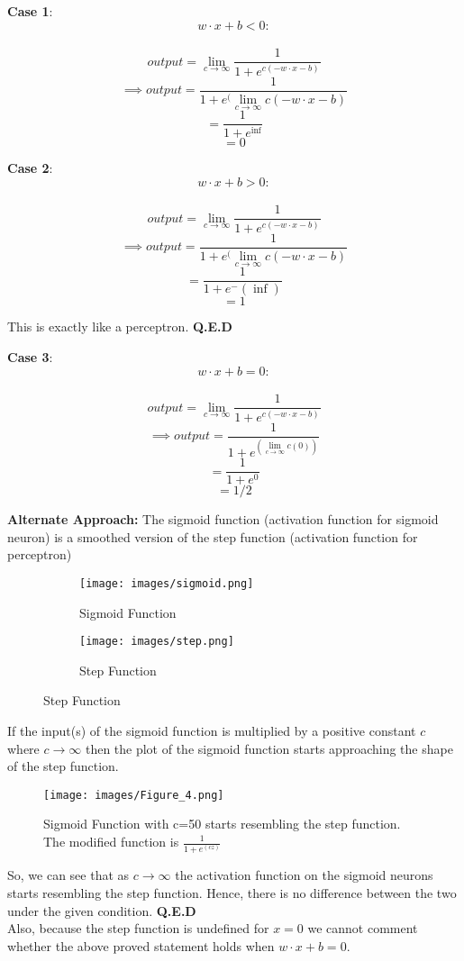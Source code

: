 \documentclass[18pt]{article}
\begin{document}
\textbf{Case 1}:$$w \cdot x + b < 0:$$\\
$$output=\lim_{c \rightarrow \infty} \frac{1}{1 + e^{c(-w\cdot x-b)}}$$
$$\implies output=\frac{1}{1+e^(\lim_{c \rightarrow \infty}c(-w\cdot x-b)}$$
$$=\frac{1}{1+e^\inf}$$
$$=0$$

\textbf{Case 2}:$$w \cdot x + b > 0:$$\\
$$output=\lim_{c \rightarrow \infty} \frac{1}{1 + e^{c(-w\cdot x-b)}}$$
$$\implies output=\frac{1}{1+e^(\lim_{c \rightarrow \infty}c(-w\cdot x-b)}$$
$$=\frac{1}{1+e^-(\inf)}$$
$$=1$$

This is exactly like a perceptron. \textbf{Q.E.D}

\textbf{Case 3}:$$w \cdot x + b = 0:$$\\
$$output=\lim_{c \rightarrow \infty} \frac{1}{1 + e^{c(-w\cdot x-b)}}$$
$$\implies output=\frac{1}{1+e^(\lim_{c \rightarrow \infty}c(0))}$$
$$=\frac{1}{1+e^0}$$
$$=1/2$$

\textbf{Alternate Approach:}
The sigmoid function (activation function for sigmoid neuron) is a smoothed version of the step function (activation function for perceptron)
\begin{figure}[htbp]
  \centering
  \begin{subfigure}[b]{0.4\textwidth}
    \texttt{[image: images/sigmoid.png]}
    \caption{Sigmoid Function}
    \label{fig:sigmoid}
  \end{subfigure}
  \hspace{1cm}
  \begin{subfigure}[b]{0.4\textwidth}
    \texttt{[image: images/step.png]}
    \caption{Step Function}
    \label{fig:step}
  \end{subfigure}
\end{figure}

If the input(s) of the sigmoid function is multiplied by a positive constant $c$ where $c\rightarrow \infty$ then the plot of the sigmoid function starts approaching the shape of the step function.


\begin{figure}[htbp]
    \centering
    \texttt{[image: images/Figure\_4.png]}
    \caption{Sigmoid Function with c=50 starts resembling the step function. The modified function is $\frac{1}{1+e^(cz)}$}
    \label{fig:my_label}
\end{figure}

So, we can see that as $c \rightarrow \infty$ the activation function on the sigmoid neurons starts resembling the step function. Hence, there is no difference between the two under the given condition. \textbf{Q.E.D}\\
Also, because the step function is undefined for $x=0$ we cannot comment whether the above proved statement holds when $w\cdot x + b = 0$.
\end{document}
